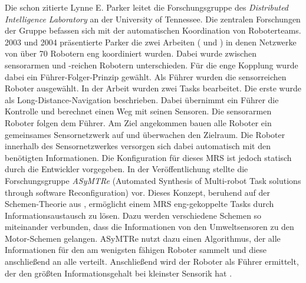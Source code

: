 Die schon zitierte Lynne E. Parker leitet die Forschungsgruppe des \textit{Distributed Intelligence Laboratory} an der University of Tennessee. Die zentralen Forschungen der Gruppe befassen sich mit der automatischen Koordination von Roboterteams. 2003 und 2004 präsentierte Parker die zwei Arbeiten (\cite{parker2003effect} und \cite{parker2004tightly}) in denen Netzwerke von über 70 Robotern eng koordiniert wurden. Dabei wurde zwischen sensorarmen und -reichen Robotern unterschieden. Für die enge Kopplung wurde dabei ein Führer-Folger-Prinzip gewählt. Als Führer wurden die sensorreichen Roboter ausgewählt. In der Arbeit wurden zwei Tasks bearbeitet. Die erste wurde als Long-Distance-Navigation beschrieben. Dabei übernimmt ein Führer die Kontrolle und berechnet einen Weg mit seinen Sensoren. Die sensorarmen Roboter folgen dem Führer. Am Ziel angekommen bauen alle Roboter ein gemeinsames Sensornetzwerk auf und überwachen den Zielraum. Die Roboter innerhalb des Sensornetzwerkes versorgen sich dabei automatisch mit den benötigten Informationen. Die Konfiguration für dieses MRS ist jedoch statisch durch die Entwickler vorgegeben. In der Veröffentlichung \cite{parker2005enabling} stellte die Forschungsgruppe \textit{ASyMTRe} (Automated Synthesis of Multi-robot Task solutions through software Reconfiguration) vor. Dieses Konzept, beruhend auf der Schemen-Theorie aus \cite{arkin1987motor}, ermöglicht einem MRS eng-gekoppelte Tasks durch Informationsaustausch zu lösen. Dazu werden verschiedene Schemen so miteinander verbunden, dass die Informationen von den Umweltsensoren zu den Motor-Schemen gelangen. ASyMTRe nutzt dazu einen Algorithmus, der alle Informationen für den am wenigsten fähigen Roboter sammelt und diese anschließend an alle verteilt. Anschließend wird der Roboter als Führer ermittelt, der den größten Informationsgehalt bei kleinster Sensorik hat \citep{lundh2006plan} .

